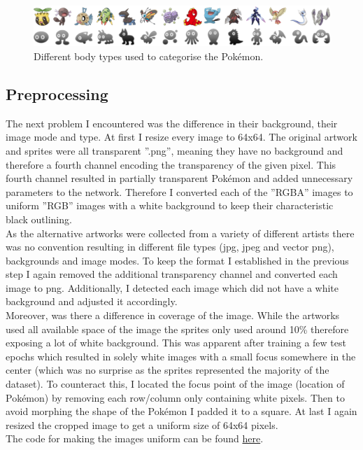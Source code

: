 \documentclass[12pt]{article}
\theoremstyle{plain}
\theoremstyle{definition}
\theoremstyle{remark}
\begin{document}
\begin{figure}[h]
	\centering
	\includegraphics[width=\linewidth]{src/Images/bodyCategorys}
	\caption[Body Categories]{Different body types used to categorise the Pokémon.}
	\label{fig:bodycategorys}
\end{figure}

\subsection{Preprocessing}
The next problem I encountered was the difference in their background, their image mode and
type. At first I resize every image to 64x64. The original artwork and sprites were all transparent ”.png”, meaning they have no background and therefore a fourth channel encoding the transparency of the given pixel. This fourth channel resulted in partially transparent Pokémon and added unnecessary parameters to the network. Therefore I converted each of the ”RGBA”
images to uniform ”RGB” images with a white background to keep their characteristic black outlining. \\
As the alternative artworks were collected from a variety of different artists there was no convention resulting in different file types (jpg, jpeg and vector png), backgrounds and image modes.
To keep the format I established in the previous step I again removed the additional transparency channel and converted each image to png. Additionally, I detected each image which did not have a white background and adjusted it accordingly.\\
 Moreover, was there a difference
in coverage of the image. While the artworks used all available space of the image the sprites only used around 10\% therefore exposing a lot of white background. This was apparent after training a few test epochs which resulted in solely white images with a small focus somewhere in the center (which was no surprise as the sprites represented the majority of the dataset). To counteract this, I located the focus point of the image (location of Pokémon) by removing
each row/column only containing white pixels. Then to avoid morphing the shape of the Pokémon I padded it to a square. At last I again resized the cropped image to get a uniform size of 64x64 pixels.\\
The code for making the images uniform can be found \href{https://github.com/mhueppe/Diffusion_Models/blob/master/preprocessing/preprocessing_uniform_data.py}{here}.
\end{document}
